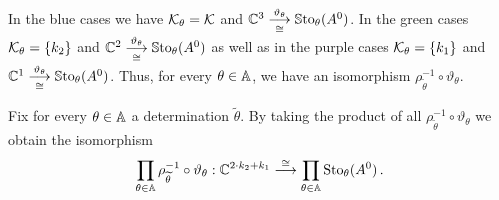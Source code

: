 In the \textcolor{blue!75!black}{blue} cases we have $\mathcal{K}_\theta=\mathcal{K}$ and
$\mathbb{C}^3\overset{\vartheta_\theta}{\underset{\cong}{\longrightarrow}}\operatorname{\mathbb{S}to}_\theta(A^0)$.
In the \textcolor{green!75!black}{green} cases $\mathcal{K}_\theta=\{k_2\}$ and
$\mathbb{C}^2\overset{\vartheta_\theta}{\underset{\cong}{\longrightarrow}}\operatorname{\mathbb{S}to}_\theta(A^0)$ as
well as in the \textcolor{purple!75!black}{purple} cases $\mathcal{K}_\theta=\{k_1\}$
and $\mathbb{C}^1\overset{\vartheta_\theta}{\underset{\cong}{\longrightarrow}}\operatorname{\mathbb{S}to}_\theta(A^0)$.
Thus, for every $\theta\in\mathbb{A}$, we have an isomorphism
$\rho_{\tilde\theta}^{-1}\circ\vartheta_\theta$.
\begin{prop}
  Fix for every $\theta\in\mathbb{A}$ a determination $\tilde\theta$.
  By taking the product of all $\rho_{\tilde\theta}^{-1}\circ\vartheta_\theta$
  we obtain the isomorphism
  \[
    \prod_{\theta\in\mathbb{A}}\rho_{\widetilde\theta}^{-1}\circ\vartheta_\theta:
    \mathbb{C}^{2\cdot k_2 + k_1}
    \overset\cong\longrightarrow
    \prod_{\theta\in\mathbb{A}}\operatorname{Sto}_\theta(A^0) \,.
  \]
\end{prop}


